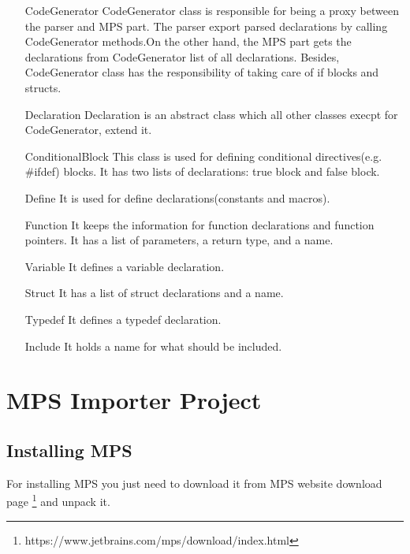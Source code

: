 \documentclass[titlepage]{article}
\begin{document}
\begin{itemize}
\item[CodeGenerator]
CodeGenerator class is responsible for being a proxy between the parser and MPS part. The parser export parsed declarations by calling CodeGenerator methods.On the other hand, the MPS part gets the declarations from CodeGenerator list of all declarations. Besides, CodeGenerator class has the responsibility of taking care of if blocks and structs.
\item[Declaration]
Declaration is an abstract class which all other classes execpt for CodeGenerator, extend it.
\item[ConditionalBlock]
This class is used for defining conditional directives(e.g. \#ifdef) blocks. It has two lists of declarations: true block and false block.
\item[Define]
It is used for define declarations(constants and macros).
\item[Function]
It keeps the information for function declarations and function pointers. It has a list of parameters, a return type, and a name. 
\item[Variable]
It defines a variable declaration.
\item[Struct]
It has a list of struct declarations and a name.
\item[Typedef]
It defines a typedef declaration.
\item[Include]
It holds a name for what should be included.
\end{itemize}

\section{MPS Importer Project}

\subsection{Installing MPS}
For installing MPS you just need to download it from MPS website download page \footnote{https://www.jetbrains.com/mps/download/index.html} and unpack it.
\end{document}
